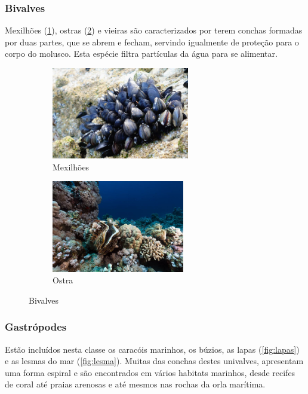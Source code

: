 \documentclass{report}
\begin{document}
\subsubsection{Bivalves}
Mexilhões (\ref{fig:mexilhao}), ostras (\ref{fig:ostra}) e vieiras são caracterizados por terem conchas formadas por duas partes, que se abrem e fecham, servindo igualmente de proteção para o corpo do molusco. Esta espécie filtra partículas da água para se alimentar.

\begin{figure}[H]
\center
    	\begin{subfigure}{.5\textwidth}
    	\center
        	\includegraphics[height=4cm]{imagens/mexilhao.jpg}
        	\caption{Mexilhões}
        	\label{fig:mexilhao}
    	\end{subfigure}%
   	\begin{subfigure}{.5\textwidth}
    	\center
        	\includegraphics[height=4cm]{imagens/ostra.jpg}
        	\caption{Ostra}
       	\label{fig:ostra}
    	\end{subfigure}
    \caption{Bivalves}
    	\label{fig:bivalves}
\end{figure}

\subsubsection{Gastrópodes}
Estão incluídos nesta classe os caracóis marinhos, os búzios, as lapas (\ref{fig:lapas}) e as lesmas do mar (\ref{fig:lesma}). Muitas das conchas destes univalves, apresentam uma forma espiral e são encontrados em vários habitats marinhos, desde recifes de coral até praias arenosas e até mesmos nas rochas da orla marítima.
\end{document}

